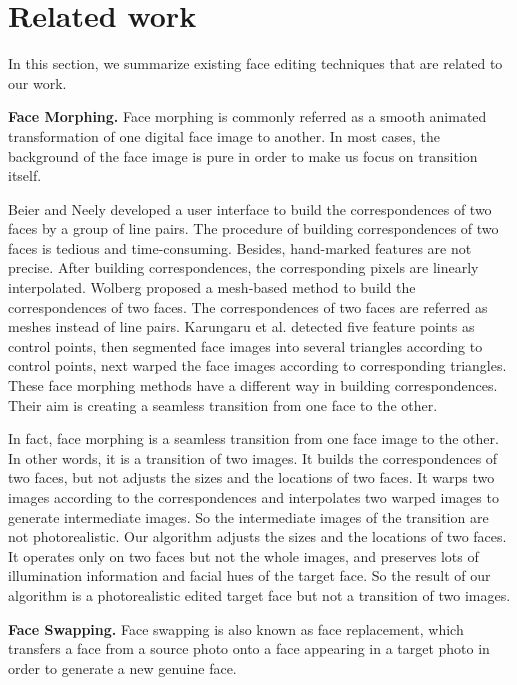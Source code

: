 \section{Related work}

In this section, we summarize existing face editing techniques that are related to our work.

\noindent\textbf{Face Morphing.} Face morphing is commonly referred as a smooth animated transformation of one digital face image to another.
In most cases, the background of the face image is pure in order to make us focus on transition itself.

Beier and Neely \cite{fbim} developed a user interface to build the correspondences of two faces by a group of line pairs.
The procedure of building correspondences of two faces is tedious and time-consuming. Besides, hand-marked features are not precise. After building correspondences, the corresponding pixels are linearly interpolated.
Wolberg \cite{wol} proposed a mesh-based method to build the correspondences of two faces.
The correspondences of two faces are referred as meshes instead of line pairs. Karungaru et al. \cite{mhf} detected five feature points as control points, then segmented face images into several triangles according to control points, next warped the face images according to corresponding triangles. These face morphing methods have a different way in building correspondences. Their aim is creating a seamless transition from one face to the other.

 In fact, face morphing is a seamless transition from one face image to the other. In other words, it is a transition of two images. It builds the correspondences of two faces, but not adjusts the sizes and the locations of two faces. It warps two images according to the correspondences and interpolates two warped images to generate intermediate images. So the intermediate images of the transition are not photorealistic. Our algorithm adjusts  the sizes and the locations of two faces. It operates only on two faces but not the whole images, and preserves lots of illumination information and facial hues of the target face. So the result of our algorithm is a photorealistic edited target face but not a transition of two images.

\noindent\textbf{Face Swapping.} Face swapping is also known as face replacement, which transfers a face from a source photo onto a face appearing in a target photo in order to generate a new genuine face.

